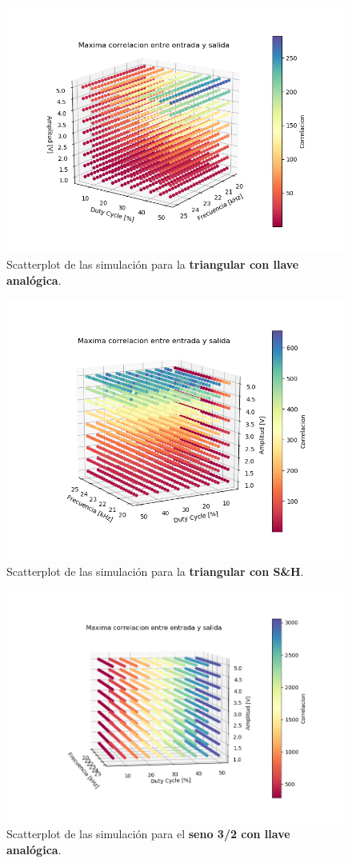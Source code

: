 \begin{figure}[H]
\centering
	\includegraphics[width=0.8\linewidth]{ImagenesEjercicio6/scatter_llave_triang.png}
	\caption{Scatterplot de las simulación para la \textbf{triangular con llave analógica}.}
	\label{triang_llave}
\end{figure}

\begin{figure}[H]
\centering
	\includegraphics[width=0.8\linewidth]{ImagenesEjercicio6/scatter_sh_triang.png}
	\caption{Scatterplot de las simulación para la \textbf{triangular con S\&H}.}
	\label{triang_sh}
\end{figure}

\begin{figure}[H]
\centering
	\includegraphics[width=0.8\linewidth]{ImagenesEjercicio6/scatter_llave_sen32.png}
	\caption{Scatterplot de las simulación para el \textbf{seno 3/2 con llave analógica}.}
	\label{sen32_llave}
\end{figure}

